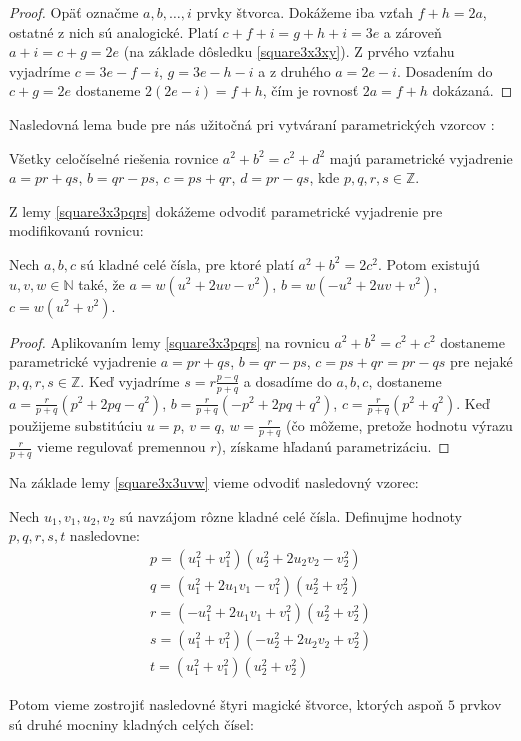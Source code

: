 \begin{proof} Opäť označme $a, b, \dots , i$ prvky štvorca. Dokážeme iba vzťah $f + h = 2a$, ostatné z nich sú analogické. Platí $c + f + i = g + h + i = 3e$ a zároveň $a + i = c + g = 2e$ (na základe dôsledku \ref{square3x3xy}). Z prvého vzťahu vyjadríme $c = 3e - f - i$, $g = 3e - h - i$ a z druhého $a = 2e - i$. Dosadením do $c + g = 2e$ dostaneme $2(2e - i) = f + h$, čím je rovnosť $2a = f + h$ dokázaná.
\end{proof}

Nasledovná lema bude pre nás užitočná pri vytváraní parametrických vzorcov \cite{algebraic}:

\begin{lemma}
\label{square3x3pqrs}
Všetky celočíselné riešenia rovnice $a^2 + b^2 = c^2 + d^2$ majú parametrické vyjadrenie $a = pr + qs$, $b = qr - ps$, $c = ps + qr$, $d = pr - qs$, kde $p,q,r,s \in \mathbb{Z}$.
\end{lemma}

Z lemy \ref{square3x3pqrs} dokážeme odvodiť parametrické vyjadrenie pre modifikovanú rovnicu:

\begin{lemma} 
\label{square3x3uvw}
Nech $a,b,c$ sú kladné celé čísla, pre ktoré platí $a^2 + b^2 = 2c^2$. Potom existujú $u,v,w \in \mathbb{N}$ také, že $a = w(u^2 + 2uv - v^2)$, $b = w(- u^2 + 2uv + v^2)$, $c = w(u^2 + v^2)$.
\end{lemma}

\begin{proof} 
Aplikovaním lemy \ref{square3x3pqrs} na rovnicu $a^2 + b^2 = c^2 + c^2$ dostaneme parametrické vyjadrenie $a = pr + qs$, $b = qr - ps$, $c = ps + qr = pr - qs$ pre nejaké $p,q,r,s \in \mathbb{Z}$. Keď vyjadríme $s = r \frac{p-q}{p+q}$ a dosadíme do $a,b,c$, dostaneme $a =  \frac{r}{p+q} (p^2 + 2pq - q^2)$, $b = \frac{r}{p+q} (-p^2 + 2pq + q^2)$, $c = \frac{r}{p+q} (p^2 + q^2)$. Keď použijeme substitúciu $u = p$, $v = q$, $w = \frac{r}{p+q}$ (čo môžeme, pretože hodnotu výrazu $\frac{r}{p+q}$ vieme regulovať premennou $r$), získame hľadanú parametrizáciu.
\end{proof}

Na základe lemy \ref{square3x3uvw} vieme odvodiť nasledovný vzorec:

\begin{theorem}
\label{3x3square5squares}
Nech $u_1, v_1, u_2, v_2$ sú navzájom rôzne kladné celé čísla. Definujme hodnoty $p,q,r,s,t$ nasledovne:
\begin{gather*}
p = (u_1^2 + v_1^2)(u_2^2 + 2u_2 v_2 - v_2^2) \\
q = (u_1^2 + 2u_1 v_1 - v_1^2)(u_2^2 + v_2^2) \\
r = (- u_1^2 + 2u_1 v_1 + v_1^2)(u_2^2 + v_2^2) \\
s = (u_1^2 + v_1^2)(-u_2^2 + 2u_2 v_2 + v_2^2) \\
t = (u_1^2 + v_1^2)(u_2^2 + v_2^2)
\end{gather*}

Potom vieme zostrojiť nasledovné štyri magické štvorce, ktorých aspoň $5$ prvkov sú druhé mocniny kladných celých čísel:
\end{theorem}

